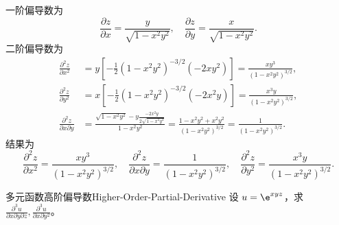 \begin{solution}
    一阶偏导数为
    \begin{equation}
        \frac{\partial z}{\partial x} = \frac{y}{\sqrt{1-x^{2}y^{2}}}, \quad \frac{\partial z}{\partial y} = \frac{x}{\sqrt{1-x^{2}y^{2}}}.
    \end{equation}
    二阶偏导数为
    \begin{equation}
        \begin{aligned}
            \frac{\partial^{2} z}{\partial x^{2}}        & = y \left[ -\frac{1}{2}(1-x^{2}y^{2})^{-3/2}(-2xy^{2}) \right] = \frac{xy^{3}}{(1-x^{2}y^{2})^{3/2}},                                                                           \\
            \frac{\partial^{2} z}{\partial y^{2}}        & = x \left[ -\frac{1}{2}(1-x^{2}y^{2})^{-3/2}(-2x^{2}y) \right] = \frac{x^{3}y}{(1-x^{2}y^{2})^{3/2}},                                                                           \\
            \frac{\partial^{2} z}{\partial x \partial y} & = \frac{\sqrt{1-x^{2}y^{2}} - y \frac{-2x^{2}y}{2\sqrt{1-x^{2}y^{2}}}}{1-x^{2}y^{2}} = \frac{1-x^{2}y^{2} + x^{2}y^{2}}{(1-x^{2}y^{2})^{3/2}} = \frac{1}{(1-x^{2}y^{2})^{3/2}}.
        \end{aligned}
    \end{equation}
    结果为
    \begin{equation}
        \boxed{\frac{\partial^{2} z}{\partial x^{2}} = \frac{xy^{3}}{(1-x^{2}y^{2})^{3/2}}, \quad \frac{\partial^{2} z}{\partial x \partial y} = \frac{1}{(1-x^{2}y^{2})^{3/2}}, \quad \frac{\partial^{2} z}{\partial y^{2}} = \frac{x^{3}y}{(1-x^{2}y^{2})^{3/2}}.}
    \end{equation}
\end{solution}

\begin{problem}{多元函数高阶偏导数}{Higher-Order-Partial-Derivative}
    设 $u = \e^{xyz}$，求 $\frac{\partial^{3} u}{\partial x \partial y \partial z}, \frac{\partial^{3} u}{\partial x \partial y^{2}}$。
\end{problem}

